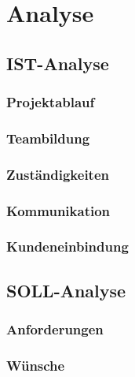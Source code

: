 \newpage
\section{Analyse}
\subsection{IST-Analyse}
\subsubsection{Projektablauf}
\subsubsection{Teambildung}
\subsubsection{Zuständigkeiten}
\subsubsection{Kommunikation}
\subsubsection{Kundeneinbindung}
\subsection{SOLL-Analyse}
\subsubsection{Anforderungen}
\subsubsection{Wünsche}